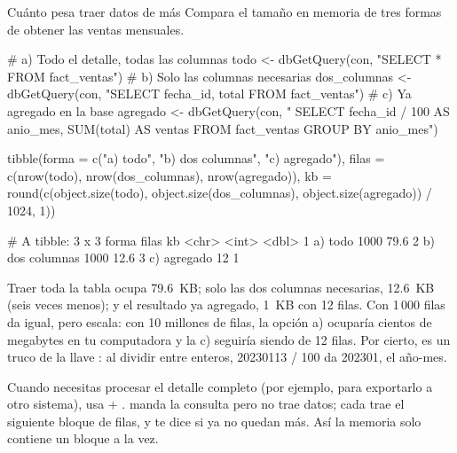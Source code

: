 \begin{ejemplo}{Cuánto pesa traer datos de más}
Compara el tamaño en memoria de tres formas de obtener las ventas
mensuales.
\end{ejemplo}

\begin{rcode}
# a) Todo el detalle, todas las columnas
todo <- dbGetQuery(con, "SELECT * FROM fact_ventas")
# b) Solo las columnas necesarias
dos_columnas <- dbGetQuery(con, "SELECT fecha_id, total FROM fact_ventas")
# c) Ya agregado en la base
agregado <- dbGetQuery(con, "
  SELECT fecha_id / 100 AS anio_mes, SUM(total) AS ventas
  FROM fact_ventas GROUP BY anio_mes")

tibble(forma = c("a) todo", "b) dos columnas", "c) agregado"),
       filas = c(nrow(todo), nrow(dos_columnas), nrow(agregado)),
       kb    = round(c(object.size(todo), object.size(dos_columnas),
                       object.size(agregado)) / 1024, 1))
\end{rcode}

\begin{rsalida}
# A tibble: 3 x 3
  forma           filas    kb
  <chr>           <int> <dbl>
1 a) todo          1000  79.6
2 b) dos columnas  1000  12.6
3 c) agregado        12   1  
\end{rsalida}

Traer toda la tabla ocupa 79.6~KB; solo las dos columnas necesarias, 12.6~KB
(seis veces menos); y el resultado ya agregado, 1~KB con 12 filas. Con
1\,000 filas da igual, pero escala: con 10 millones de filas, la opción a)
ocuparía cientos de megabytes en tu computadora y la c) seguiría siendo de
12 filas. Por cierto,  es un truco de la
llave : al dividir entre enteros, 20230113 / 100 da 202301,
el año-mes.

Cuando necesitas procesar el detalle completo (por ejemplo, para exportarlo
a otro sistema), usa  + .
 manda la consulta pero no trae datos; cada
 trae el siguiente bloque de  filas, y
 te dice si ya no quedan más. Así la memoria solo
contiene un bloque a la vez.


